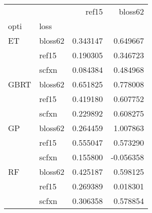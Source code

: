 \begin{tabular}{llrr}
\toprule
   &       &     ref15 &   bloss62 \\
opti & loss &           &           \\
\midrule
ET & bloss62 &  0.343147 &  0.649667 \\
   & ref15 &  0.190305 &  0.346723 \\
   & scfxn &  0.084384 &  0.484968 \\
GBRT & bloss62 &  0.651825 &  0.778008 \\
   & ref15 &  0.419180 &  0.607752 \\
   & scfxn &  0.229892 &  0.608275 \\
GP & bloss62 &  0.264459 &  1.007863 \\
   & ref15 &  0.555047 &  0.573290 \\
   & scfxn &  0.155800 & -0.056358 \\
RF & bloss62 &  0.425187 &  0.598125 \\
   & ref15 &  0.269389 &  0.018301 \\
   & scfxn &  0.306358 &  0.578854 \\
\bottomrule
\end{tabular}
